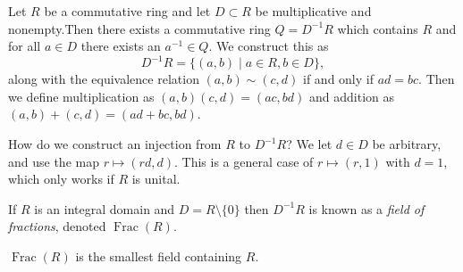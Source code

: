 \begin{theorem}
Let $R$ be a commutative ring and let $D \subset R$ be multiplicative and nonempty.Then there exists a commutative ring $Q = D^{-1}R$ which contains $R$ and for all $a \in D$ there exists an $a^{-1} \in Q$. We construct this as 
\[ D^{-1}R = \{(a,b) \mid a \in R, b \in D\}, \]
along with the equivalence relation $(a,b) \sim (c,d)$ if and only if $ad = bc$. Then we define multiplication as $(a,b)(c,d) = (ac,bd)$ and addition as $(a,b) + (c,d) = (ad + bc, bd)$.
\end{theorem}

How do we construct an injection from $R$ to $D^{-1}R$? We let $d \in D$ be arbitrary, and use the map $r \mapsto (rd,d)$. This is a general case of $r \mapsto (r,1)$ with $d = 1$, which only works if $R$ is unital.

\begin{definition}
If $R$ is an integral domain and $D = R \setminus \{0\}$ then $D^{-1}R$ is known as a \emph{field of fractions}, denoted $\operatorname{Frac}(R)$.
\end{definition}

\begin{corollary}
$\operatorname{Frac}(R)$ is the smallest field containing $R$.
\end{corollary}

\begin{example}
\end{example}